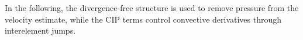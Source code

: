 \documentclass[11pt]{article}
\theoremstyle{remark}\newtheorem{remark}{Remark}
\theoremstyle{plain}
\begin{document}

In the following, the divergence-free structure is used to remove pressure from the velocity estimate, while the CIP terms control convective derivatives through interelement jumps.
\end{document}

